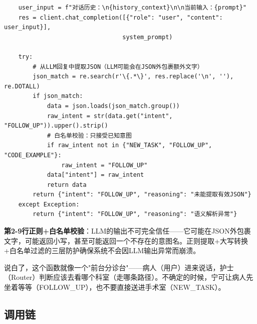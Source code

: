 \documentclass[11pt,a4paper]{ctexbook}
\begin{document}
\begin{verbatim}
    user_input = f"对话历史：\n{history_context}\n\n当前输入：{prompt}"
    res = client.chat_completion([{"role": "user", "content": user_input}],
                                 system_prompt)

    try:
        # 从LLM回复中提取JSON（LLM可能会在JSON外包裹额外文字）
        json_match = re.search(r'\{.*\}', res.replace('\n', ''), re.DOTALL)
        if json_match:
            data = json.loads(json_match.group())
            raw_intent = str(data.get("intent", "FOLLOW_UP")).upper().strip()
            # 白名单校验：只接受已知意图
            if raw_intent not in {"NEW_TASK", "FOLLOW_UP", "CODE_EXAMPLE"}:
                raw_intent = "FOLLOW_UP"
            data["intent"] = raw_intent
            return data
        return {"intent": "FOLLOW_UP", "reasoning": "未能提取有效JSON"}
    except Exception:
        return {"intent": "FOLLOW_UP", "reasoning": "语义解析异常"}
\end{verbatim}

\textbf{第2-9行正则+白名单校验}：LLM的输出不可完全信任——它可能在JSON外包裹文字，可能返回小写，甚至可能返回一个不存在的意图名。正则提取+大写转换+白名单过滤的三层防护确保系统不会因LLM输出异常而崩溃。

\begin{plainbox}
    说白了，这个函数就像一个"前台分诊台"——病人（用户）进来说话，护士（Router）判断应该去看哪个科室（走哪条路径）。不确定的时候，宁可让病人先坐着等等（FOLLOW\_UP），也不要直接送进手术室（NEW\_TASK）。
\end{plainbox}

\subsection{调用链}

\begin{center}
\end{center}
\end{document}
